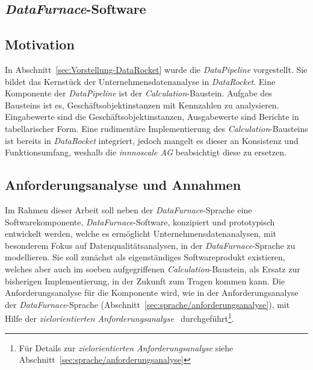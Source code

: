 \documentclass[
  language=german, %
  type=bachelor%
]{isthesis}
\begin{document}
\begin{content}
  \chapter{\textit{DataFurnace}-Software}

  \section{Motivation}
  In Abschnitt~\ref{sec:Vorstellung-DataRocket} wurde die \textit{DataPipeline}
  vorgestellt. Sie bildet das Kernstück der Unternehmensdatenanalyse in
  \textit{DataRocket}. Eine Komponente der \textit{DataPipeline} ist der
  \textit{Calculation}-Baustein.  Aufgabe des Bausteins ist es,
  Geschäftsobjektinstanzen mit Kennzahlen zu analysieren. Eingabewerte sind die
  Geschäftsobjektinstanzen, Ausgabewerte sind Berichte in tabellarischer Form.
  Eine rudimentäre Implementierung des \textit{Calculation}-Bausteins ist
  bereits in \textit{DataRocket} integriert, jedoch mangelt es dieser an
  Konsistenz und Funktionsumfang, weshalb die \textit{innnoscale AG}
  beabsichtigt diese zu ersetzen.

  \section{Anforderungsanalyse und Annahmen}
  Im Rahmen dieser Arbeit soll neben der \textit{DataFurnace}-Sprache eine
  Softwarekomponente, \textit{DataFurnace}-Software, konzipiert
  und prototypisch entwickelt werden, welche es ermöglicht Unternehmensdatenanalysen, mit
  besonderem Fokus auf Datenqualitätsanalysen, in der
  \textit{DataFurnace}-Sprache zu modellieren.  Sie soll zunächst als
  eigenständiges Softwareprodukt existieren, welches aber auch im soeben
  aufgegriffenen \textit{Calculation}-Baustein, als Ersatz zur bisherigen
  Implementierung, in der Zukunft zum Tragen kommen kann. Die
  Anforderungsanalyse für die Komponente wird, wie in der Anforderungsanalyse
  der \textit{DataFurnace}-Sprache
  (Abschnitt~\ref{sec:sprache/anforderungsanalyse}), mit Hilfe der
  \textit{zielorientierten Anforderungsanalyse}~\cite[][]{van2001goal}
  durchgeführt\footnote{Für Details zur \textit{zielorientierten
  Anforderungsanalyse} siehe Abschnitt~\ref{sec:sprache/anforderungsanalyse}}. 



\end{content}
\end{document}
